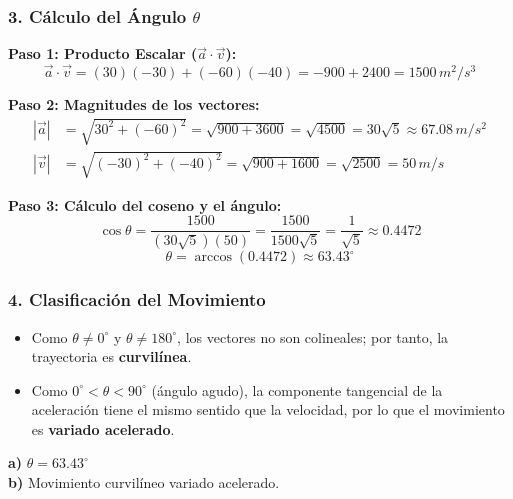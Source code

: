 \documentclass[12pt, a4paper]{article}
\begin{document}
\subsubsection*{3. Cálculo del Ángulo $\theta$}

\textbf{Paso 1: Producto Escalar ($\vec{a} \cdot \vec{v}$):}
\begin{equation}
    \vec{a} \cdot \vec{v} = (30)(-30) + (-60)(-40) = -900 + 2400 = 1500 \, \si{m^2/s^3}
\end{equation}

\textbf{Paso 2: Magnitudes de los vectores:}
\begin{align*}
    |\vec{a}| &= \sqrt{30^2 + (-60)^2} = \sqrt{900 + 3600} = \sqrt{4500} = 30\sqrt{5} \approx 67.08 \, \si{m/s^2} \\
    |\vec{v}| &= \sqrt{(-30)^2 + (-40)^2} = \sqrt{900 + 1600} = \sqrt{2500} = 50 \, \si{m/s}
\end{align*}

\textbf{Paso 3: Cálculo del coseno y el ángulo:}
\begin{equation}
    \cos \theta = \frac{1500}{(30\sqrt{5})(50)} = \frac{1500}{1500\sqrt{5}} = \frac{1}{\sqrt{5}} \approx 0.4472
\end{equation}
\begin{equation}
    \theta = \arccos(0.4472) \approx 63.43^\circ
\end{equation}

\subsubsection*{4. Clasificación del Movimiento}

\begin{itemize}
    \item Como $\theta \neq 0^\circ$ y $\theta \neq 180^\circ$, los vectores no son colineales; por tanto, la trayectoria es \textbf{curvilínea}.
    \item Como $0^\circ < \theta < 90^\circ$ (ángulo agudo), la componente tangencial de la aceleración tiene el mismo sentido que la velocidad, por lo que el movimiento es \textbf{variado acelerado}.
\end{itemize}

\begin{tcolorbox}[colback=green!5!white, colframe=green!50!black, title=Respuesta Final]
\centering
\textbf{a)} $\theta = 63.43^\circ$ \\
\textbf{b)} Movimiento curvilíneo variado acelerado.
\end{tcolorbox}
\end{document}

